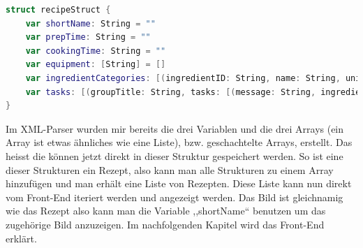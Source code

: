 \documentclass[12pt]{article}
\begin{document}
\begin{lstlisting}[language=Swift,caption={Struktur für ein Rezept},label={lst:struktur}]
struct recipeStruct {
    var shortName: String = ""
    var prepTime: String = ""
    var cookingTime: String = ""
    var equipment: [String] = []
    var ingredientCategories: [(ingredientID: String, name: String, unit: String)] = [] //X: ingredientX[0: ID, 1: Name, 2: Unit]
    var tasks: [(groupTitle: String, tasks: [(message: String, ingredientID: String, minMax: [String])])] = [] //X: groupX[0: groupTitle, X: taskX[0: message, 1: ingredientID, 2: minMax[min,max]]]
}
\end{lstlisting}
Im XML-Parser wurden mir bereits die drei Variablen und die drei Arrays (ein Array ist etwas ähnliches wie eine Liste), bzw. geschachtelte Arrays, erstellt. Das heisst die können jetzt direkt in dieser Struktur gespeichert werden. So ist eine dieser Strukturen ein Rezept, also kann man alle Strukturen zu einem Array hinzufügen und man erhält eine Liste von Rezepten. Diese Liste kann nun direkt vom Front-End iteriert werden und angezeigt werden. Das Bild ist gleichnamig wie das Rezept also kann man die Variable ,,shortName`` benutzen um das zugehörige Bild anzuzeigen. Im nachfolgenden Kapitel wird das Front-End erklärt.
\end{document}
